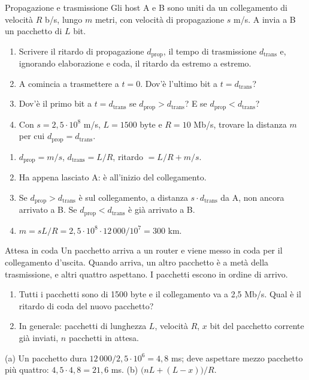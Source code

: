 \begin{esercizio}{Propagazione e trasmissione}
Gli host A e B sono uniti da un collegamento di velocità $R$ b/s, lungo $m$ metri, con velocità di propagazione $s$ m/s. A invia a B un
pacchetto di $L$ bit.
\begin{enumerate}[label=(\alph*)]
    \item Scrivere il ritardo di propagazione $d_{\text{prop}}$, il tempo di trasmissione $d_{\text{trans}}$ e, ignorando elaborazione e
          coda, il ritardo da estremo a estremo.
    \item A comincia a trasmettere a $t = 0$. Dov'è l'ultimo bit a $t = d_{\text{trans}}$?
    \item Dov'è il primo bit a $t = d_{\text{trans}}$ se $d_{\text{prop}} > d_{\text{trans}}$? E se $d_{\text{prop}} < d_{\text{trans}}$?
    \item Con $s = 2{,}5 \cdot 10^8$ m/s, $L = 1500$ byte e $R = 10$ Mb/s, trovare la distanza $m$ per cui $d_{\text{prop}} =
          d_{\text{trans}}$.
\end{enumerate}

\svolgimento
\begin{enumerate}[label=(\alph*)]
    \item $d_{\text{prop}} = m/s$, $d_{\text{trans}} = L/R$, ritardo $= L/R + m/s$.
    \item Ha appena lasciato A: è all'inizio del collegamento.
    \item Se $d_{\text{prop}} > d_{\text{trans}}$ è sul collegamento, a distanza $s \cdot d_{\text{trans}}$ da A, non ancora arrivato a B. Se
          $d_{\text{prop}} < d_{\text{trans}}$ è già arrivato a B.
    \item $m = s L / R = 2{,}5 \cdot 10^8 \cdot 12\,000 / 10^7 = 300$ km.
\end{enumerate}
\end{esercizio}

\begin{esercizio}{Attesa in coda}
Un pacchetto arriva a un router e viene messo in coda per il collegamento d'uscita. Quando arriva, un altro pacchetto è a metà della
trasmissione, e altri quattro aspettano. I pacchetti escono in ordine di arrivo.
\begin{enumerate}[label=(\alph*)]
    \item Tutti i pacchetti sono di 1500 byte e il collegamento va a 2,5 Mb/s. Qual è il ritardo di coda del nuovo pacchetto?
    \item In generale: pacchetti di lunghezza $L$, velocità $R$, $x$ bit del pacchetto corrente già inviati, $n$ pacchetti in attesa.
\end{enumerate}

\svolgimento
(a) Un pacchetto dura $12\,000/2{,}5 \cdot 10^6 = 4{,}8$ ms; deve aspettare mezzo pacchetto più quattro: $4{,}5 \cdot 4{,}8 = 21{,}6$ ms.
(b) $\bigl(nL + (L - x)\bigr)/R$.
\end{esercizio}

